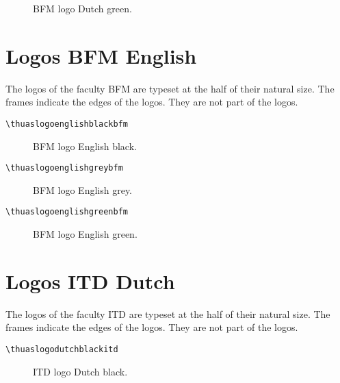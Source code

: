 \documentclass[a4paper,12pt]{article}
\begin{document}
\begin{figure}[H]
\centering\fboxsep=0pt%
\fbox{%
\scalebox{0.7071}{\thuaslogodutchgreenbfm}}
\caption{BFM logo Dutch green.}
\end{figure}


\section{Logos BFM English}
The logos of the faculty BFM are typeset at the half of their natural size.
The frames indicate the edges of the logos. They are not part of the logos.

\begin{verbatim}
\thuaslogoenglishblackbfm
\end{verbatim}

\begin{figure}[H]
\centering\fboxsep=0pt%
\fbox{%
\scalebox{0.7071}{\thuaslogoenglishblackbfm}}
\caption{BFM logo English black.}
\end{figure}

\begin{verbatim}
\thuaslogoenglishgreybfm
\end{verbatim}

\begin{figure}[H]
\centering\fboxsep=0pt%
\fbox{%
\scalebox{0.7071}{\thuaslogoenglishgreybfm}}
\caption{BFM logo English grey.}
\end{figure}

\begin{verbatim}
\thuaslogoenglishgreenbfm
\end{verbatim}

\begin{figure}[H]
\centering\fboxsep=0pt%
\fbox{%
\scalebox{0.7071}{\thuaslogoenglishgreenbfm}}
\caption{BFM logo English green.}
\end{figure}


\section{Logos ITD Dutch}
The logos of the faculty ITD are typeset at the half of their natural size.
The frames indicate the edges of the logos. They are not part of the logos.

\begin{verbatim}
\thuaslogodutchblackitd
\end{verbatim}

\begin{figure}[H]
\centering\fboxsep=0pt%
\fbox{%
\scalebox{0.7071}{\thuaslogodutchblackitd}}
\caption{ITD logo Dutch black.}
\end{figure}
\end{document}

